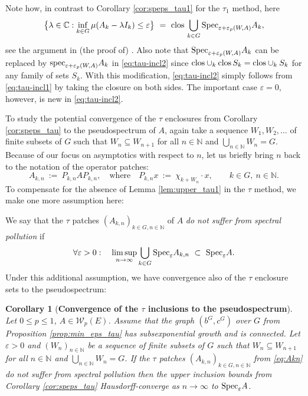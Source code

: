 \documentclass{article}
\newcommand\Christian[1]{\marginpar{\textcolor{green}{\tt #1}}}
\newcommand\C{{\mathbb C}}
\newcommand\N{{\mathbb N}}
\newcommand\W{{\mathcal W}}
\newcommand\eps{{\varepsilon}}
\newcommand\specn{{\rm spec}}   %
\newcommand\Specn{{\rm Spec}}   %
\newcommand\Speps{{\rm Spec}_\eps}
\newcommand\clos{{\rm clos\,}}
\newtheorem{corollary}[theorem]{Corollary}
\numberwithin{equation}{section}   %
\numberwithin{figure}{section}  %
\begin{document}
%
Note how, in contrast to Corollary \ref{cor:speps_tau1} for the $\tau_1$ method, here
\begin{equation} \label{eq:3.1_tau}
\big\{\lambda\in\C: \inf_{k\in G}\mu(A_k-\lambda I_k)\le\eps\big\}\ =\ \clos\bigcup_{k\in G} \Specn_{\eps+\eps_p(W,A)} A_k,
\end{equation}
see  the argument in (the proof of) \cite[Proposition 3.1]{CW.Heng.ML:JST}.
Also note that $\Specn_{\eps+\eps_p(W,A)} A_k$ can be replaced by $\specn_{\eps+\eps_p(W,A)} A_k$ in \eqref{eq:tau-incl2} since $\clos\!\cup_k \clos S_k=\clos\!\cup_k S_k$ for any family of sets $S_k$. With this modification, \eqref{eq:tau-incl2} simply follows from \eqref{eq:tau-incl1} by taking the closure on both sides. The important case $\eps=0$, however, is new in \eqref{eq:tau-incl2}.


To study the potential convergence of the $\tau$ enclosures from Corollary \ref{cor:speps_tau} to the pseudospectrum of $A$, again take a sequence $W_1, W_2,\dots$ of finite subsets of $G$ such that $W_n\subseteq W_{n+1}$ for all $n\in\N$ and $\bigcup_{n\in\N} W_n = G$. Because of our focus on asymptotics with respect to $n$, let us briefly bring $n$ back to the notation of the operator patches:
\begin{equation} \label{eq:Akn}
A_{k,n}\ :=\ P_{k,n}AP_{k,n},
\quad\text{where}\quad
P_{k,n}x\ :=\ \chi_{k+W_n}\cdot x,
\qquad k\in G,\ n\in\N.
\end{equation}
To compensate for the absence of Lemma \ref{lem:upper_tau1} in the $\tau$ method, we make one more assumption here:

We say that the $\tau$ patches $(A_{k,n})_{k\in G, n\in\N}$ of $A$ {\sl do not suffer from spectral pollution} if
\begin{equation} \label{eq:nopoll}
\forall\eps>0:\quad \limsup_{n\to\infty} \bigcup_{k\in G} \Speps A_{k,n}\ \subset\ \Speps A.
\end{equation}
Under this additional assumption, we have convergence also of the $\tau$ enclosure sets to the pseudospectrum:

\begin{corollary}[\bf Convergence of the $\tau$ inclusions to the pseudospectrum] \label{cor:conv_tau}
Let $0\leq p\leq 1$, $A\in\W_p(E)$.
Assume that the graph $(b^G,c^G)$ over $G$ from Proposition \ref{prop:min_eps_tau} has subsexponential growth and is connected.
Let $\eps>0$ and 
$(W_n)_{n\in\N}$ be a sequence of finite subsets of $G$ such that $W_n\subseteq W_{n+1}$ for all $n\in\N$ and $\bigcup_{n\in\N} W_n = G$. If the $\tau$ patches $(A_{k,n})_{k\in G, n\in\N}$ from \eqref{eq:Akn} do not suffer from spectral pollution
then the upper inclusion bounds from Corollary \ref{cor:speps_tau} Hausdorff-converge as $n\to\infty$ to $\Speps A$.
\end{corollary}
\end{document}
